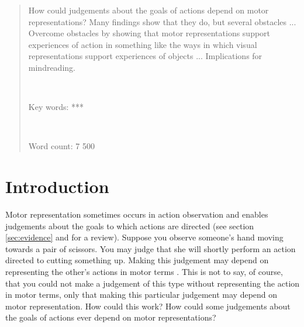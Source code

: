 \documentclass[12pt,\papersize]{extarticle}
\begin{document}
\setlength\footnotesep{1em}


\maketitle
\title{}






\begin{abstract}
\noindent
%
How could judgements about the goals of actions depend on motor representations? Many findings show that they do, but several obstacles ... Overcome obstacles by showing that motor representations support experiences of action in something like the ways in which visual representations support experiences of objects ... Implications for mindreading.
%

\ %

\noindent
Key words: ***

\ %

\noindent
Word count: 7 500
\end{abstract}










\section{Introduction}

Motor representation sometimes occurs in action observation and enables judgements about the goals to which actions are directed (see section \vref{sec:evidence} and \citealp{rizzolatti_functional_2010} for a review). 
Suppose you observe someone's hand moving towards a pair of scissors. 
You may judge that she will shortly perform an action directed to cutting something up. 
Making this judgement may depend on representing the other's actions in motor terms \citep{boria:2009_intention, ortigue:2010_understanding}.  
This is not to say, of course, that you could not make a judgement of this type without representing the action in motor terms, only that making this particular judgement may depend on motor representation. 
How could this work? 
How could some judgements about the goals of actions ever depend on motor representations?
\end{document}
